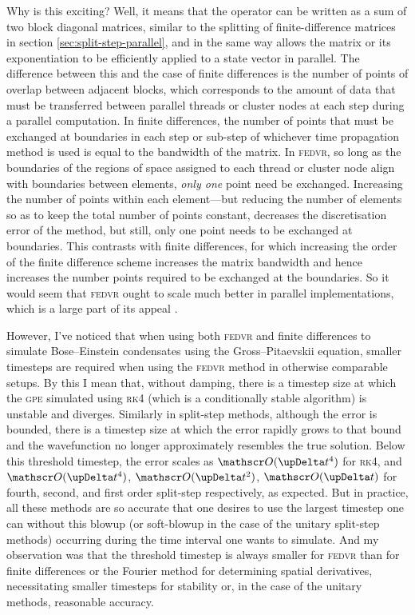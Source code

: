 Why is this exciting? Well, it means that the operator can be written as a sum of two block diagonal matrices, similar to the splitting of finite-difference matrices in section \ref{sec:split-step-parallel}, and in the same way allows the matrix or its exponentiation to be efficiently applied to a state vector in parallel. The difference between this and the case of finite differences is the number of points of overlap between adjacent blocks, which corresponds to the amount of data that must be transferred between parallel threads or cluster nodes at each step during a parallel computation. In finite differences, the number of points that must be exchanged at boundaries in each step or sub-step of whichever time propagation method is used is equal to the bandwidth of the matrix. In \textsc{fedvr}, so long as the boundaries of the regions of space assigned to each thread or cluster node align with boundaries between elements, \emph{only one} point need be exchanged. Increasing the number of points within each element---but reducing the number of elements so as to keep the total number of points constant, decreases the discretisation error of the method, but still, only one point needs to be exchanged at boundaries. This contrasts with finite differences, for which increasing the order of the finite difference scheme increases the matrix bandwidth and hence increases the number points required to be exchanged at the boundaries. So it would seem that \textsc{fedvr} ought to scale much better in parallel implementations, which is a large part of its appeal \cite{schneider_discrete_2005,schneider_parallel_2006}.

However, I've noticed that when using both \textsc{fedvr} and finite differences to simulate Bose--Einstein condensates using the Gross--Pitaevskii equation, smaller timesteps are required when using the \textsc{fedvr} method in otherwise comparable setups. By this I mean that, without damping, there is a timestep size at which the \textsc{gpe} simulated using \textsc{rk4} (which is a conditionally stable algorithm) is unstable and diverges. Similarly in split-step methods, although the error is bounded, there is a timestep size at which the error rapidly grows to that bound and the wavefunction no longer approximately resembles the true solution. Below this threshold timestep, the error scales as $\Ord{\upDelta t^4}$ for \textsc{rk4}, and $\Ord{\upDelta t^4}$, $\Ord{\upDelta t^2}$, $\Ord{\upDelta t}$ for fourth, second, and first order split-step respectively, as expected. But in practice, all these methods are so accurate that one desires to use the largest timestep one can without this blowup (or soft-blowup in the case of the unitary split-step methods) occurring during the time interval one wants to simulate. And my observation was that the threshold timestep is always smaller for \textsc{fedvr} than for finite differences or the Fourier method for determining spatial derivatives, necessitating smaller timesteps for stability or, in the case of the unitary methods, reasonable accuracy.

